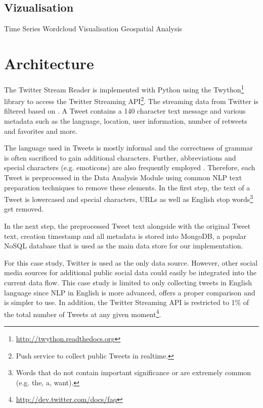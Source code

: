 \subsection{Vizualisation}
\label{subsec:visualisation}
Time Series 
Wordcloud Visualisation
Geospatial Analysis



\section{Architecture}
\label{sec:architecture}
The Twitter Stream Reader is implemented with Python using the Twython\footnote{\url{http://twython.readthedocs.org} \accessednote} library to access the Twitter Streaming API\footnote{Push service to collect public Tweets in realtime.}. The streaming data from Twitter is filtered based on . A Tweet contains a 140 character text message and various metadata such as the language, location, user information, number of retweets and favorites and more. 

The language used in Tweets is mostly informal and the correctness of grammar is often sacrificed to gain additional characters. Further, abbreviations and special characters (e.g. emoticons) are also frequently employed \cite[67]{TwitterDataAnalytics2013}. Therefore, each Tweet is preprocessed in the Data Analysis Module using common NLP text preparation techniques to remove these elements. In the first step, the text of a Tweet is lowercased and special characters, URLs as well as English stop words\footnote{Words that do not contain important significance or are extremely common (e.g. the, a, want).} get removed.

In the next step, the preprocessed Tweet text alongside with the original Tweet text, creation timestamp and all metadata is stored into MongoDB, a popular NoSQL database that is used as the main data store for our implementation.

For this case study, Twitter is used as the only data source. However, other social media sources for additional public social data could easily be integrated into the current data flow. This case study is limited to only collecting tweets in English language since NLP in English is more advanced, offers a proper comparison and is simpler to use. In addition, the Twitter Streaming API is restricted to 1\% of the total number of Tweets at any given moment\footnote{\url{http://dev.twitter.com/docs/faq} \accessednote}.